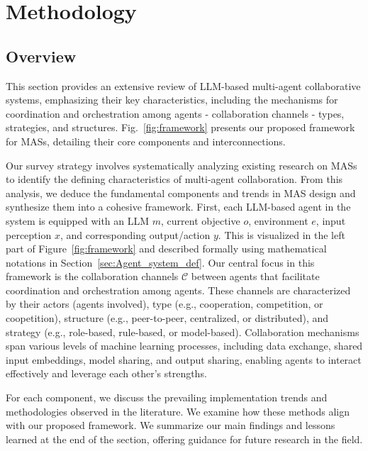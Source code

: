 \documentclass[acmsmall,nonacm]{acmart}
\begin{document}
\section{Methodology} \label{sec:Method}


    \subsection{Overview}
        This section provides an extensive review of LLM-based multi-agent collaborative systems, emphasizing their key characteristics, including the mechanisms for coordination and orchestration among agents - collaboration channels - types, strategies, and structures. Fig.~\ref{fig:framework} presents our proposed framework for MASs, detailing their core components and interconnections.

        Our survey strategy involves systematically analyzing existing research on MASs to identify the defining characteristics of multi-agent collaboration. From this analysis, we deduce the fundamental components and trends in MAS design and synthesize them into a cohesive framework. First, each LLM-based agent in the system is equipped with an LLM $m$, current objective $o$, environment $e$, input perception $x$, and corresponding output/action $y$. This is visualized in the left part of Figure~\ref{fig:framework} and described formally using mathematical notations in Section~\ref{sec:Agent_system_def}. Our central focus in this framework is the collaboration channels $\mathcal{C}$ between agents that facilitate coordination and orchestration among agents. These channels are characterized by their actors (agents involved), type (e.g., cooperation, competition, or coopetition), structure (e.g., peer-to-peer, centralized, or distributed), and strategy (e.g., role-based, rule-based, or model-based). 
        Collaboration mechanisms span various levels of machine learning processes, including data exchange, shared input embeddings, model sharing, and output sharing, enabling agents to interact effectively and leverage each other’s strengths.

        For each component, we discuss the prevailing implementation trends and methodologies observed in the literature. We examine how these methods align with our proposed framework. We summarize our main findings and lessons learned at the end of the section, offering guidance for future research in the field.
\end{document}
